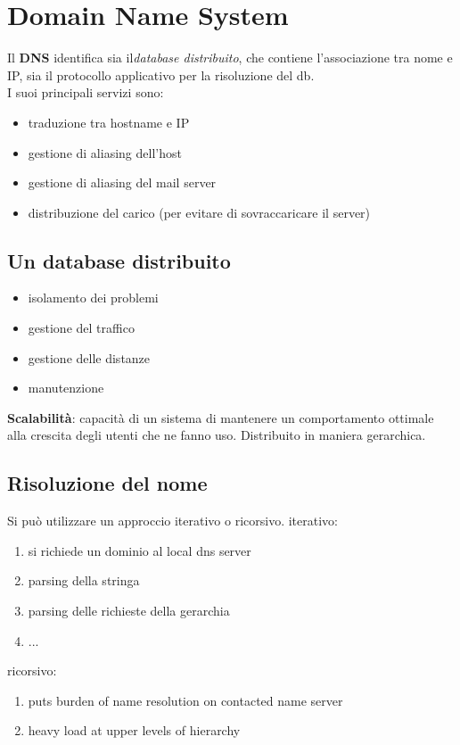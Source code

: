 \section{Domain Name System}
Il \textbf{DNS} identifica sia il\textit{database distribuito}, che contiene l'associazione tra nome e IP, sia il protocollo applicativo per la risoluzione del db.\\
I suoi principali servizi sono:
\begin{itemize}
	\item traduzione tra hostname e IP
	\item gestione di aliasing dell'host
	\item gestione di aliasing del mail server
	\item distribuzione del carico (per evitare di sovraccaricare il server)
\end{itemize}

\subsection{Un database distribuito}

\begin{itemize}
	\item isolamento dei problemi
	\item gestione del traffico
	\item gestione delle distanze
	\item manutenzione
\end{itemize}

\textbf{Scalabilità}: capacità di un sistema di mantenere un comportamento ottimale alla crescita degli utenti che ne fanno uso.
Distribuito in maniera gerarchica.

\subsection{Risoluzione del nome}
Si può utilizzare un approccio iterativo o ricorsivo.
iterativo:
\begin{enumerate}
	\item si richiede un dominio al local dns server
	\item parsing della stringa
	\item parsing delle richieste della gerarchia
	\item ...
\end{enumerate}
ricorsivo:
\begin{enumerate}
	\item puts burden of name resolution on contacted name server
	\item heavy load at upper levels of hierarchy
\end{enumerate}

